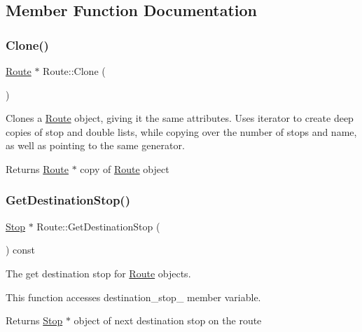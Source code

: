 \subsection{Member Function Documentation}
\mbox{\label{classRoute_a4031b4a218b1530e28dcf5ee5c6fa8e7}} 
\subsubsection{\texorpdfstring{Clone()}{Clone()}}
{\footnotesize\ttfamily \hyperlink{classRoute}{Route} $\ast$ Route\+::\+Clone (\begin{DoxyParamCaption}{ }\end{DoxyParamCaption})}



Clones a \hyperlink{classRoute}{Route} object, giving it the same attributes. Uses iterator to create deep copies of stop and double lists, while copying over the number of stops and name, as well as pointing to the same generator. 

\begin{DoxyReturn}{Returns}
\hyperlink{classRoute}{Route} $\ast$ copy of \hyperlink{classRoute}{Route} object 
\end{DoxyReturn}
\mbox{\label{classRoute_a44af714485a55a8b6da374399e036cc1}} 
\subsubsection{\texorpdfstring{Get\+Destination\+Stop()}{GetDestinationStop()}}
{\footnotesize\ttfamily \hyperlink{classStop}{Stop} $\ast$ Route\+::\+Get\+Destination\+Stop (\begin{DoxyParamCaption}{ }\end{DoxyParamCaption}) const}



The get destination stop for \hyperlink{classRoute}{Route} objects. 

This function accesses destination\+\_\+stop\+\_\+ member variable.

\begin{DoxyReturn}{Returns}
\hyperlink{classStop}{Stop} $\ast$ object of next destination stop on the route 
\end{DoxyReturn}
\mbox{\label{classRoute_a78274b615be2cd45006c5790290eda37}} 
